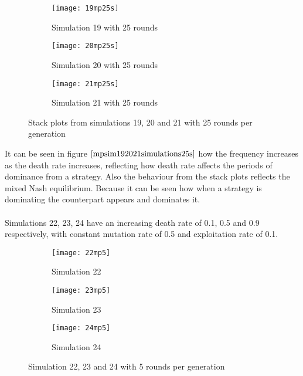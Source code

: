 \begin{figure}[H]       
    \centering
    \begin{subfigure}[b]{0.3\textwidth}
	\centering
	{\texttt{[image: 19mp25s]}}   
    	\caption{Simulation 19 with 25 rounds}
	\label{fig:mpsim19s25}
    \end{subfigure}
    \hfill
    \begin{subfigure}[b]{0.3\textwidth}
	\centering
	{\texttt{[image: 20mp25s]}}   
    	\caption{Simulation 20 with 25 rounds}
	\label{fig:mpsim20s25}
    \end{subfigure}
    \hfill
    \begin{subfigure}[b]{0.3\textwidth}
	\centering
	{\texttt{[image: 21mp25s]}}   
    	\caption{Simulation 21 with 25 rounds}
	\label{fig:mpsim21s25}
    \end{subfigure}
    \caption{Stack plots from simulations 19, 20 and 21 with 25 rounds per generation}
    \label{mpsim192021simulations25s}
\end{figure}
It can be seen in figure $\ref{mpsim192021simulations25s}$ how the frequency increases as the death rate increases, reflecting how death rate affects the periods of dominance from a strategy. Also the behaviour from the stack plots reflects the mixed Nash equilibrium. Because it can be seen how when a strategy is dominating the counterpart appears and dominates it.
\\\\Simulations 22, 23, 24 have an increasing death rate of 0.1, 0.5 and 0.9 respectively, with constant mutation rate of 0.5 and exploitation rate of 0.1. 

\begin{figure}[H]       
    \centering
    \begin{subfigure}[b]{0.3\textwidth}
	\centering
	{\texttt{[image: 22mp5]}}   
    	\caption{Simulation 22}
	\label{fig:mpsim225}
    \end{subfigure}
    \hfill
    \begin{subfigure}[b]{0.3\textwidth}
	\centering
	{\texttt{[image: 23mp5]}}   
    	\caption{Simulation 23}
	\label{fig:mpsim235}
    \end{subfigure}
    \hfill
    \begin{subfigure}[b]{0.3\textwidth}
	\centering
	{\texttt{[image: 24mp5]}}   
    	\caption{Simulation 24}
	\label{fig:mpsim245}
    \end{subfigure}
    \caption{Simulation 22, 23 and 24 with 5 rounds per generation}
    \label{mpsim222324simulations5}
\end{figure}

